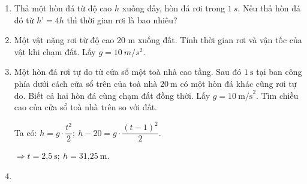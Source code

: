 \begin{enumerate}[label=\bfseries Câu \arabic*:]
		\item {}
		{
			
		Thả một hòn đá từ độ cao $h$ xuống đấy, hòn đá rơi trong $\SI{1}{s}$. Nếu thả hòn đá đó từ $h’ = 4h$ thì thời gian rơi là bao nhiêu?
	}
	
	\item {}
	
	{Một vật nặng rơi từ độ cao 20 m xuống đất. Tính thời gian rơi và vận tốc của vật khi chạm đất. Lấy $g=\SI{10}{m/s^2}$.}
	\item {}
	
	
	{
		Một hòn đá rơi tự do từ cửa sổ một toà nhà cao tầng. Sau đó $1\ \text{s}$ tại ban công phía dưới cách cửa sổ trên của toà nhà $20\ \text{m}$ có một hòn đá khác cũng rơi tự do. Biết cả hai hòn đá cùng chạm đất đồng thời. Lấy $g=10\ \text{m/s}^2$. Tìm chiều cao của cửa sổ toà nhà trên so với đất.	
	}
	\hideall
	{	
		
		Ta có: $h=g\cdot \dfrac{t^2}{2}; \ h-20=g\cdot \dfrac{\left(t-1 \right)^2 }{2}$.
		
		$\Rightarrow t=\text{2,5}\ \text{s}; \ h=\text{31,25}\ \text{m}$.  
	}
	\item {}
	

\end{enumerate}
